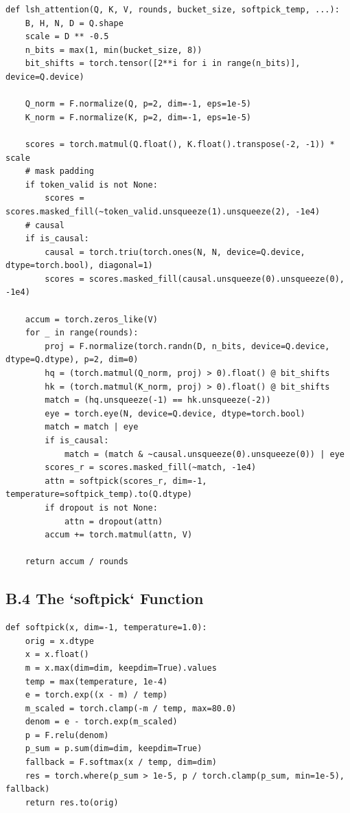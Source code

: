 \begin{lstlisting}
def lsh_attention(Q, K, V, rounds, bucket_size, softpick_temp, ...):
    B, H, N, D = Q.shape
    scale = D ** -0.5
    n_bits = max(1, min(bucket_size, 8))
    bit_shifts = torch.tensor([2**i for i in range(n_bits)], device=Q.device)
    
    Q_norm = F.normalize(Q, p=2, dim=-1, eps=1e-5)
    K_norm = F.normalize(K, p=2, dim=-1, eps=1e-5)
    
    scores = torch.matmul(Q.float(), K.float().transpose(-2, -1)) * scale
    # mask padding
    if token_valid is not None:
        scores = scores.masked_fill(~token_valid.unsqueeze(1).unsqueeze(2), -1e4)
    # causal
    if is_causal:
        causal = torch.triu(torch.ones(N, N, device=Q.device, dtype=torch.bool), diagonal=1)
        scores = scores.masked_fill(causal.unsqueeze(0).unsqueeze(0), -1e4)
    
    accum = torch.zeros_like(V)
    for _ in range(rounds):
        proj = F.normalize(torch.randn(D, n_bits, device=Q.device, dtype=Q.dtype), p=2, dim=0)
        hq = (torch.matmul(Q_norm, proj) > 0).float() @ bit_shifts
        hk = (torch.matmul(K_norm, proj) > 0).float() @ bit_shifts
        match = (hq.unsqueeze(-1) == hk.unsqueeze(-2))
        eye = torch.eye(N, device=Q.device, dtype=torch.bool)
        match = match | eye
        if is_causal:
            match = (match & ~causal.unsqueeze(0).unsqueeze(0)) | eye
        scores_r = scores.masked_fill(~match, -1e4)
        attn = softpick(scores_r, dim=-1, temperature=softpick_temp).to(Q.dtype)
        if dropout is not None:
            attn = dropout(attn)
        accum += torch.matmul(attn, V)
    
    return accum / rounds
\end{lstlisting}

\subsection{B.4 The `softpick` Function}

\begin{lstlisting}
def softpick(x, dim=-1, temperature=1.0):
    orig = x.dtype
    x = x.float()
    m = x.max(dim=dim, keepdim=True).values
    temp = max(temperature, 1e-4)
    e = torch.exp((x - m) / temp)
    m_scaled = torch.clamp(-m / temp, max=80.0)
    denom = e - torch.exp(m_scaled)
    p = F.relu(denom)
    p_sum = p.sum(dim=dim, keepdim=True)
    fallback = F.softmax(x / temp, dim=dim)
    res = torch.where(p_sum > 1e-5, p / torch.clamp(p_sum, min=1e-5), fallback)
    return res.to(orig)
\end{lstlisting}

